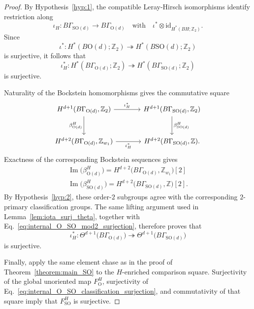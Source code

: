 \documentclass[aps,prx,reprint,superscriptaddress,twocolumn,amsmath,amssymb,amsfonts, nofootinbib]{revtex4-2}
\theoremstyle{apsstyle}
\begin{document}
\begin{proof}
By Hypothesis~\ref{hyp:1}, the compatible Leray-Hirsch
isomorphisms identify restriction along
\begin{equation*}
    \iota_H:
    B\Gamma_{\mathrm{SO}(d)}
    \longrightarrow
    B\Gamma_{\mathrm O(d)}\quad \text{with}\quad 
    \iota^*\otimes\mathrm{id}_{H^*(BH;\mathbb Z_2)}.
\end{equation*}
Since
\begin{equation*}
    \iota^*:
    H^*(B\mathrm O(d);\mathbb Z_2)
    \twoheadrightarrow
    H^*(B\mathrm{SO}(d);\mathbb Z_2)
\end{equation*}
is surjective, it follows that
\begin{equation}
    \iota_H^*:
    H^*(B\Gamma_{\mathrm O(d)};\mathbb Z_2)
    \twoheadrightarrow
    H^*(B\Gamma_{\mathrm{SO}(d)};\mathbb Z_2)
    \label{eq:internal_O_SO_mod2_surjection}
\end{equation}
is surjective.

\noindent Naturality of the Bockstein homomorphisms gives the commutative
square
\begin{equation}
\begin{tikzcd}[column sep=large,row sep=large]
H^{d+1}(B\Gamma_{\mathrm O(d)},\mathbb Z_2)
\arrow[r,"\iota_H^*"]
\arrow[d,"\beta_{\mathrm O(d)}^H"']
&
H^{d+1}(B\Gamma_{\mathrm{SO}(d)},\mathbb Z_2)
\arrow[d,"\beta_{\mathrm{SO}(d)}^H"]
\\
H^{d+2}(B\Gamma_{\mathrm O(d)},\mathbb Z_{w_1})
\arrow[r,"\iota_H^*"']
&
H^{d+2}(B\Gamma_{\mathrm{SO}(d)},\mathbb Z).
\end{tikzcd}
\label{eq:internal_O_SO_Bockstein_square}
\end{equation}
Exactness of the corresponding Bockstein sequences gives
\begin{gather*}
    \operatorname{Im}\bigl(\beta_{\mathrm O(d)}^H\bigr)
    =
    H^{d+2}
    \bigl(B\Gamma_{\mathrm O(d)},\mathbb Z_{w_1}\bigr)[2]\\
    \operatorname{Im}\bigl(\beta_{\mathrm{SO}(d)}^H\bigr)
    =
    H^{d+2}
    \bigl(B\Gamma_{\mathrm{SO}(d)},\mathbb Z\bigr)[2].
\end{gather*}
By Hypothesis~\ref{hyp:2}, these order-$2$ subgroups agree with the
corresponding $2$-primary classification groups. The same lifting
argument used in Lemma~\ref{lem:iota_surj_theta}, together with
Eq.~\eqref{eq:internal_O_SO_mod2_surjection}, therefore proves that
\begin{equation}
    \iota_H^*:
    \Theta^{d+1}
    \bigl(B\Gamma_{\mathrm O(d)}\bigr)
    \twoheadrightarrow
    \Theta^{d+1}
    \bigl(B\Gamma_{\mathrm{SO}(d)}\bigr)
    \label{eq:internal_O_SO_classification_surjection}
\end{equation}
is surjective.

\noindent Finally, apply the same element chase as in the proof of
Theorem~\ref{theorem:main_SO} to the $H$-enriched comparison square.
Surjectivity of the global unoriented map $F_{\mathrm O}^{H}$,
surjectivity of Eq.~\eqref{eq:internal_O_SO_classification_surjection},
and commutativity of that square imply that
$F_{\mathrm{SO}}^{H}$ is surjective.
\end{proof}
\end{document}
